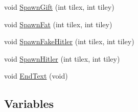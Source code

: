 \begin{DoxyCompactItemize}
\item 
void \hyperlink{WL__DEF_8H_a926bfed8ef17ab18d4acb24492765cad}{SpawnGift} (int tilex, int tiley)
\item 
void \hyperlink{WL__DEF_8H_a3ba9b8d2b90684238cf1054a06991040}{SpawnFat} (int tilex, int tiley)
\item 
void \hyperlink{WL__DEF_8H_a955e2f73e53dd332c0c69b2030925452}{SpawnFakeHitler} (int tilex, int tiley)
\item 
void \hyperlink{WL__DEF_8H_a6f45b135127503a06762199d5c55c790}{SpawnHitler} (int tilex, int tiley)
\item 
void \hyperlink{WL__DEF_8H_a11ef38288d701a8921caf515d527cd58}{EndText} (void)
\end{DoxyCompactItemize}
\subsection*{Variables}
